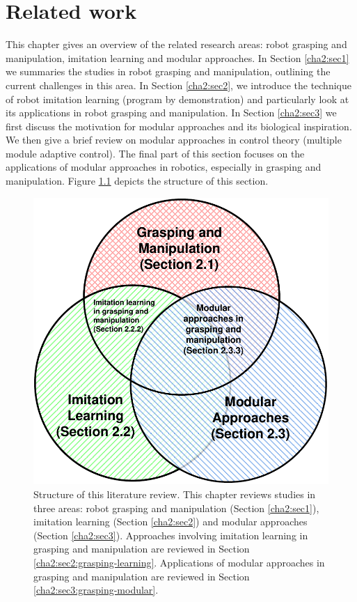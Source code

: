 \chapter{Related work}
\label{cha2}

This chapter gives an overview of the related research areas: robot grasping and manipulation, imitation learning and modular approaches. In Section \ref{cha2:sec1} we summaries the studies in robot grasping and manipulation, outlining the current challenges in this area. In Section \ref{cha2:sec2}, we introduce the technique of robot imitation learning (program by demonstration) and particularly look at its applications in robot grasping and manipulation. In Section \ref{cha2:sec3} we first discuss the motivation for modular approaches and its biological inspiration. We then give a brief review on modular approaches in control theory (multiple module adaptive control). The final part of this section focuses on the applications of modular approaches in robotics, especially in grasping and manipulation. Figure \ref{fig:litreview} depicts the structure of this section.

\begin{figure}
\centering
  \includegraphics[width=15cm]{./fig_cha2/litreview.pdf}
  \caption{Structure of this literature review. This chapter reviews studies in three areas: robot grasping and manipulation (Section \ref{cha2:sec1}), imitation learning (Section \ref{cha2:sec2}) and modular approaches (Section \ref{cha2:sec3}). Approaches involving imitation learning in grasping and manipulation are reviewed in Section \ref{cha2:sec2:grasping-learning}. Applications of modular approaches in grasping and manipulation are reviewed in Section \ref{cha2:sec3:grasping-modular}.}
  \label{fig:litreview}
\end{figure}





%
%
%





